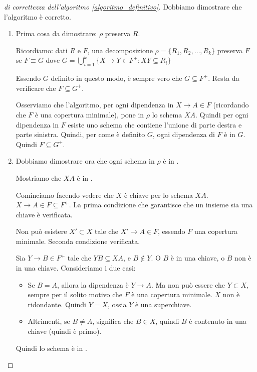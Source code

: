 \begin{proof}[di correttezza dell'algoritmo \ref{algoritmo_definitivo}]
Dobbiamo dimostrare che l'algoritmo \`e corretto.

\begin{enumerate}
    \item Prima cosa da dimostrare: $\rho$ preserva $R$.

    Ricordiamo: dati $R$ e $F$, una decomposizione $\rho = \{ R_1, R_2, \ldots, R_k \}$ preserva $F$ se $F \equiv G$ dove $G = \bigcup_{i = 1}^k \{ X \to Y \in F^+ : XY \subseteq R_i \}$

    Essendo $G$ definito in questo modo, \`e sempre vero che $G \subseteq F^+$. Resta da verificare che $F \subseteq G^+$.

    Osserviamo che l'algoritmo, per ogni dipendenza in $X \to A \in F$ (ricordando che $F$ \`e una copertura minimale), pone in $\rho$ lo schema $XA$. Quindi per ogni dipendenza in $F$ esiste uno schema che contiene l'unione di parte destra e parte sinistra. Quindi, per come \`e definito $G$, ogni dipendenza di $F$ \`e in $G$. Quindi $F \subseteq G^+$.
    \item Dobbiamo dimostrare ora che ogni schema in $\rho$ \`e in .

    Mostriamo che $XA$ \`e in .

    Cominciamo facendo vedere che $X$ \`e chiave per lo schema $XA$. $X \to A \in F \subseteq F^+$. La prima condizione che garantisce che un insieme sia una chiave \`e verificata.

    Non pu\`o esistere $X' \subset X$ tale che $X' \to A \in F$, essendo $F$ una copertura minimale. Seconda condizione verificata.

    Sia $Y \to B \in F^+$ tale che $YB \subseteq XA$, e $B \notin Y$. O $B$ \`e in una chiave, o $B$ non \`e in una chiave. Consideriamo i due casi:
    \begin{itemize}
        \item Se $B = A$, allora la dipendenza \`e $Y \to A$. Ma non pu\`o essere che $Y \subset X$, sempre per il solito motivo che $F$ \`e una copertura minimale. $X$ non \`e ridondante. Quindi $Y = X$, ossia $Y$ \`e una superchiave.
        \item Altrimenti, se $B \neq A$, significa che $B \in X$, quindi $B$ \`e contenuto in una chiave (quindi \`e primo).
    \end{itemize}
    Quindi lo schema \`e in .
\end{enumerate}
\end{proof}

